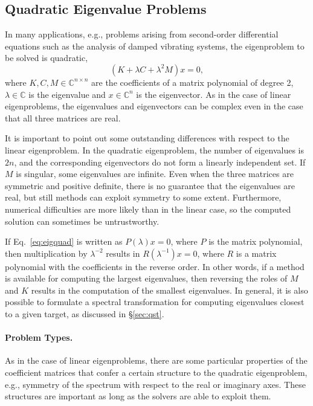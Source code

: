 \subsection{\label{sec:qep}Quadratic Eigenvalue Problems}

In many applications, e.g., problems arising from second-order differential equations such as the analysis of damped vibrating systems, the eigenproblem to be solved is quadratic,
\begin{equation}
(K+\lambda C+\lambda^2M)x=0,\label{eq:eigquad}
\end{equation}
where $K,C,M\in\mathbb{C}^{n\times n}$ are the coefficients of a matrix polynomial of degree 2, $\lambda\in\mathbb{C}$ is the eigenvalue and $x\in\mathbb{C}^n$ is the eigenvector. As in the case of linear eigenproblems, the eigenvalues and eigenvectors can be complex even in the case that all three matrices are real.

It is important to point out some outstanding differences with respect to the linear eigenproblem. In the quadratic eigenproblem, the number of eigenvalues is $2n$, and the corresponding eigenvectors do not form a linearly independent set. If $M$ is singular, some eigenvalues are infinite. Even when the three matrices are symmetric and positive definite, there is no guarantee that the eigenvalues are real, but still methods can exploit symmetry to some extent. Furthermore, numerical difficulties are more likely than in the linear case, so the computed solution can sometimes be untrustworthy.

If Eq.\ \ref{eq:eigquad} is written as $P(\lambda)x=0$, where $P$ is the matrix polynomial, then multiplication by $\lambda^{-2}$ results in $R(\lambda^{-1})x=0$, where $R$ is a matrix polynomial with the coefficients in the reverse order. In other words, if a method is available for computing the largest eigenvalues, then reversing the roles of $M$ and $K$ results in the computation of the smallest eigenvalues. In general, it is also possible to formulate a spectral transformation for computing eigenvalues closest to a given target, as discussed in \S\ref{sec:qst}.

\paragraph{Problem Types.}

As in the case of linear eigenproblems, there are some particular properties of the coefficient matrices that confer a certain structure to the quadratic eigenproblem, e.g., symmetry of the spectrum with respect to the real or imaginary axes. These structures are important as long as the solvers are able to exploit them.

